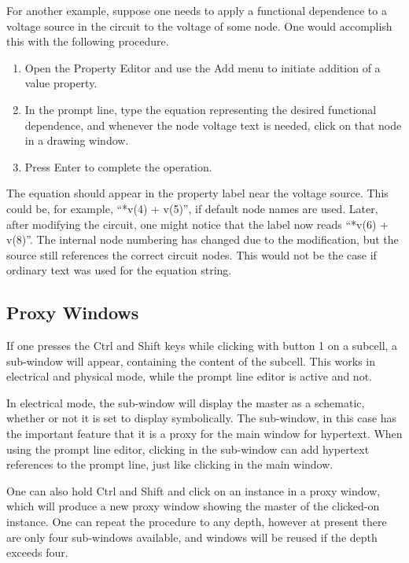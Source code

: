 For another example, suppose one needs to apply a functional
dependence to a voltage source in the circuit to the voltage of some
node.  One would accomplish this with the following procedure.
\begin{enumerate}
\item{Open the {\cb Property Editor} and use the {\cb Add} menu to
initiate addition of a {\et value} property.}
\item{In the prompt line, type the equation representing the desired
functional dependence, and whenever the node voltage text is needed,
click on that node in a drawing window.}
\item{Press {\kb Enter} to complete the operation.}
\end{enumerate}

The equation should appear in the property label near the voltage
source.  This could be, for example, ``{*v(4) + v(5)}'', if
default node names are used.  Later, after modifying the circuit, one
might notice that the label now reads ``{*v(6) + v(8)}''.  The
internal node numbering has changed due to the modification, but the
source still references the correct circuit nodes.  This would not be
the case if ordinary text was used for the equation string.

\subsection{Proxy Windows}
\label{hyproxy}

If one presses the {\kb Ctrl} and {\kb Shift} keys while clicking with
button 1 on a subcell, a sub-window will appear, containing the
content of the subcell.  This works in electrical and physical mode,
while the prompt line editor is active and not.

In electrical mode, the sub-window will display the master as a
schematic, whether or not it is set to display symbolically.  The
sub-window, in this case has the important feature that it is a proxy
for the main window for hypertext.  When using the prompt line editor,
clicking in the sub-window can add hypertext references to the prompt
line, just like clicking in the main window.

One can also hold {\kb Ctrl} and {\kb Shift} and click on an instance
in a proxy window, which will produce a new proxy window showing the
master of the clicked-on instance.  One can repeat the procedure to
any depth, however at present there are only four sub-windows
available, and windows will be reused if the depth exceeds four.

